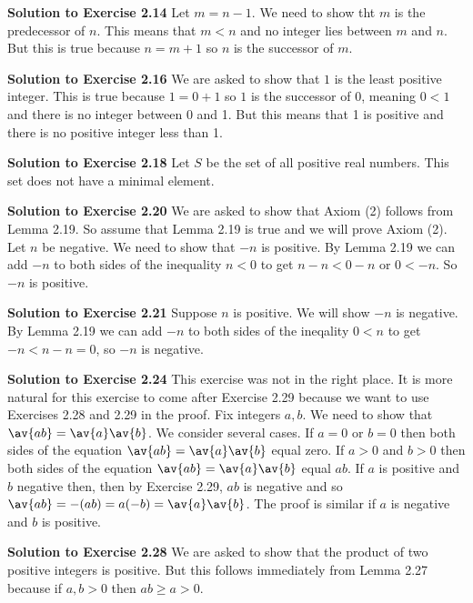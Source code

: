 \documentclass[oneside,12pt]{amsart}
\begin{document}
\bigskip


\textbf{Solution to Exercise 2.14} Let $m=n-1$. We need to show tht $m$ is
the predecessor of $n$. This means that $m<n$ and no integer lies between
$m$ and $n$. But this is true because $n=m+1$ so $n$ is the successor of $m$.


\bigskip


\textbf{Solution to Exercise 2.16} We are asked to show that $1$ is the least
positive integer. This is true because $1=0+1$ so $1$ is the successor of 0,
meaning $0 < 1$ and there is no integer between 0 and 1. But this means
that 1 is positive and there is no positive integer less than 1.

\bigskip


\textbf{Solution to Exercise 2.18} Let $S$ be the set of all positive real
numbers. This set does not have a minimal element.


\bigskip


\textbf{Solution to Exercise 2.20} We are asked to show that Axiom (2) follows
from Lemma 2.19. So assume that Lemma 2.19 is true and we will prove
Axiom (2). Let $n$ be negative. We need to show that $-n$ is positive.
By Lemma 2.19 we can add $-n$ to both sides of the inequality $n < 0$ to get
$n-n < 0 -n$ or $0 < -n$. So $-n$ is positive.

\bigskip


\textbf{Solution to Exercise 2.21} Suppose $n$ is positive. We will show $-n$
is negative. By Lemma 2.19 we can add $-n$ to both sides of the
ineqality $0<n$ to get $-n < n-n = 0$, so $-n$ is negative.


\bigskip


\textbf{Solution to Exercise 2.24} This exercise was not in the right place.
It is more natural for this exercise to come after Exercise 2.29 because we
want to use Exercises 2.28 and 2.29 in the proof. Fix integers $a,b$.
We need to show that $\av{ab} = \av{a}\av{b}$. We consider several cases.
If $a=0$ or $b=0$ then both sides of the equation
$\av{ab} = \av{a}\av{b}$ equal zero. If $a>0$ and $b>0$ then both sides of
the equation $\av{ab} = \av{a}\av{b}$ equal $ab$. If $a$ is positive and
$b$ negative then, then by Exercise 2.29, $ab$ is negative and so
$\av{ab} = -(ab) = a (-b) = \av{a}\av{b}$. The proof is similar if
$a$ is negative and $b$ is positive.

\bigskip


\textbf{Solution to Exercise 2.28} We are asked to show that the product of two
positive integers is positive. But this follows immediately from
Lemma  2.27 because if $a,b>0$ then $ab\geq a > 0$.
\end{document}
